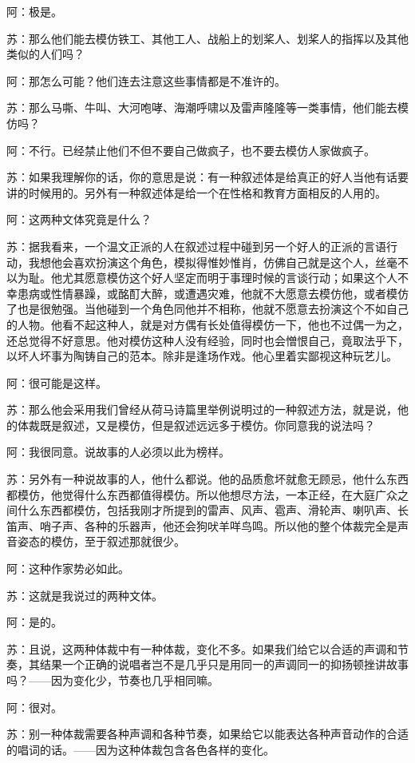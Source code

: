 \documentclass[12pt,oneside]{book}
\begin{document}
阿：极是。

苏：那么他们能去模仿铁工、其他工人、战船上的划桨人、划桨人的指挥以及其他类似的人们吗？

阿：那怎么可能？他们连去注意这些事情都是不准许的。

苏：那么马嘶、牛叫、大河咆哮、海潮呼啸以及雷声隆隆等一类事情，他们能去模仿吗？

阿：不行。已经禁止他们不但不要自己做疯子，也不要去模仿人家做疯子。

苏：如果我理解你的话，你的意思是说：有一种叙述体是给真正的好人当他有话要讲的时候用的。另外有一种叙述体是给一个在性格和教育方面相反的人用的。

阿：这两种文体究竟是什么？

苏：据我看来，一个温文正派的人在叙述过程中碰到另一个好人的正派的言语行动，我想他会喜欢扮演这个角色，模拟得惟妙惟肖，仿佛自己就是这个人，丝毫不以为耻。他尤其愿意模仿这个好人坚定而明于事理时候的言谈行动；如果这个人不幸患病或性情暴躁，或酩酊大醉，或遭遇灾难，他就不大愿意去模仿他，或者模仿了也是很勉强。当他碰到一个角色同他并不相称，他就不愿意去扮演这个不如自己的人物。他看不起这种人，就是对方偶有长处值得模仿一下，他也不过偶一为之，还总觉得不好意思。他对模仿这种人没有经验，同时也会憎恨自己，竟取法乎下，以坏人坏事为陶铸自己的范本。除非是逢场作戏。他心里着实鄙视这种玩艺儿。

阿：很可能是这样。

苏：那么他会采用我们曾经从荷马诗篇里举例说明过的一种叙述方法，就是说，他的体裁既是叙述，又是模仿，但是叙述远远多于模仿。你同意我的说法吗？

阿：我很同意。说故事的人必须以此为榜样。

苏：另外有一种说故事的人，他什么都说。他的品质愈坏就愈无顾忌，他什么东西都模仿，他觉得什么东西都值得模仿。所以他想尽方法，一本正经，在大庭广众之间什么东西都模仿，包括我刚才所提到的雷声、风声、雹声、滑轮声、喇叭声、长笛声、哨子声、各种的乐器声，他还会狗吠羊咩鸟鸣。所以他的整个体裁完全是声音姿态的模仿，至于叙述那就很少。

阿：这种作家势必如此。

苏：这就是我说过的两种文体。

阿：是的。

苏：且说，这两种体裁中有一种体裁，变化不多。如果我们给它以合适的声调和节奏，其结果一个正确的说唱者岂不是几乎只是用同一的声调同一的抑扬顿挫讲故事吗？——因为变化少，节奏也几乎相同嘛。

阿：很对。

苏：别一种体裁需要各种声调和各种节奏，如果给它以能表达各种声音动作的合适的唱词的话。——因为这种体裁包含各色各样的变化。
\end{document}
